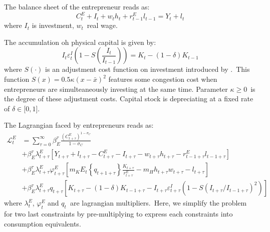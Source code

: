 \documentclass[a4paper,12pt]{article}%
\begin{document}
The balance sheet of the entrepreneur reads as:%
\begin{equation}
C_{t}^{E}+I_{t}+w_{t}h_{t}+r_{t-1}^{E}l_{t-1}=Y_{t}+l_{t}%
\end{equation}
where $I_{t}$ is investment, $w_{t}$\ real wage.

The accumulation oh physical capital is given by:%
\begin{equation}
I_{t}\varepsilon_{t}^{I}\left(  1-S\left(  \frac{I_{t}}{I_{t-1}}\right)
\right)  =K_{t}-\left(  1-\delta\right)  K_{t-1}%
\end{equation}
where $S\left(  \cdot\right)  $ is an adjustment cost function on investment
introduced by \cite{christiano2005nominal}.\ This function $S\left(  x\right)
=0.5\kappa\left(  x-\bar{x}\right)  ^{2}$ features some congestion cost when
entrepreneurs are simulteaneously investing at the same time. Parameter
$\kappa\geq0$\ is the degree of these adjustment costs. Capital stock is
depreciating at a fixed rate of $\delta\in\lbrack0,1]$.

The Lagrangian faced by entrepreneurs reads as:%
\begin{align*}
\mathcal{L}_{t}^{E}  &  =%
{\displaystyle\sum\limits_{\tau=0}^{\infty}}
\beta_{E}^{\tau}\frac{\left(  C_{t+\tau}^{E}\right)  ^{1-\sigma_{C}}}%
{1-\sigma_{C}}\\
&  +\beta_{E}^{\tau}\lambda_{t+\tau}^{E}\left[  Y_{t+\tau}+l_{t+\tau
}-C_{t+\tau}^{E}-I_{t+\tau}-w_{t+\tau}h_{t+\tau}-r_{t-1+\tau}^{E}l_{t-1+\tau
}\right] \\
&  +\beta_{E}^{\tau}\lambda_{t+\tau}^{E}\varphi_{t+\tau}^{E}\left[  m_{K}%
E_{t}\left\{  q_{t+1+\tau}\right\}  \frac{K_{t+\tau}}{r_{t+\tau}^{E}}%
-m_{H}h_{t+\tau}w_{t+\tau}-l_{t+\tau}\right] \\
&  +\beta_{E}^{\tau}\lambda_{t+\tau}^{E}q_{t+\tau}\left[  K_{t+\tau}-\left(
1-\delta\right)  K_{t-1+\tau}-I_{t+\tau}\varepsilon_{t+\tau}^{I}\left(
1-S\left(  I_{t+\tau}/I_{t-1+\tau}\right)  ^{2}\right)  \right]
\end{align*}
where $\lambda_{t}^{E}$, $\varphi_{t}^{E}$ and $q_{t}$\ are lagrangian
multipliers.\ Here, we simplify the problem for two last constraints by
pre-multiplying to express each constraints into consumption equivalents.
\end{document}
